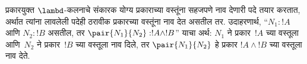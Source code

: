 \documentclass[../../../include/open-logic-section]{subfiles}
\begin{document}
प्रकारयुक्त $\lambd$-कलनाचे संकारक योग्य प्रकाराच्या
वस्तूंना सहजपणे नाव देणारी पदे तयार करतात, अर्थात
त्यांना लावलेली पदेही ठरावीक प्रकारच्या वस्तूंना नाव
देत असतील तर. उदाहरणार्थ, ``$N_1 : !A$ आणि
$N_2 : !B$ असतील, तर
$\pair{N_1}{N_2} : !A \land !B$'' याचा अर्थ:
$N_1$ ने प्रकार~$!A$ च्या वस्तूला आणि~$N_2$ ने
प्रकार~$!B$ च्या वस्तूला नाव दिले, तर
$\pair{N_1}{N_2}$ हे प्रकार $!A \land !B$ च्या
वस्तूला नाव देते.
\end{document}
